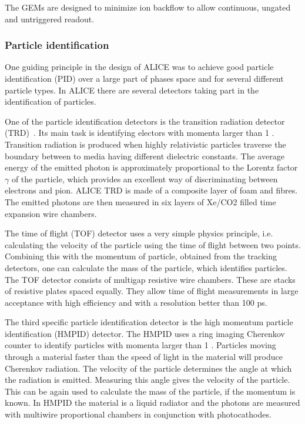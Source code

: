 The GEMs are designed to minimize ion backflow to allow continuous, ungated and untriggered readout.


\subsubsection{Particle identification}
One guiding principle in the design of ALICE was to achieve good particle identification (PID) over  a large part of phases space and for several different particle types. In ALICE there are several detectors taking part in the identification of particles. 

One of the particle identification detectors is the transition radiation detector (TRD)~\cite{trd}. Its main task is identifying electors with momenta larger than 1 \gev. Transition radiation is produced when highly relativistic particles traverse the boundary between to media having different dielectric constants. The average energy of the emitted photon is approximately proportional to the Lorentz factor $\gamma$ of the particle, which provides an excellent way of discriminating between electrons and pion. ALICE TRD is made of a composite layer of foam and fibres. The emitted photons are then measured in six layers of Xe/CO2 filled time expansion wire chambers. 

The time of flight  (TOF) detector uses a very simple physics principle, i.e. calculating the velocity of the particle using the time of flight between two points. Combining this with the momentum of particle, obtained from the tracking detectors, one can calculate the mass of the particle, which identifies particles. The TOF detector consists of multigap resistive wire chambers. These are stacks of resistive plates spaced equally. They allow time of flight measurements in large acceptance with high efficiency and with a resolution better than 100 ps. 

The third specific particle identification detector is the high momentum particle identification (HMPID) detector. The HMPID uses a ring imaging Cherenkov counter to identify particles with momenta larger than 1 \gev. Particles moving through a material faster than the speed of light in the material will produce Cherenkov radiation. The velocity of the particle determines the angle at which the radiation is emitted. Measuring this angle gives the velocity of the particle. This can be again used to calculate the mass of the particle, if the momentum is known. In HMPID the material is a liquid radiator and the photons are measured with multiwire proportional chambers in conjunction with photocathodes. 

